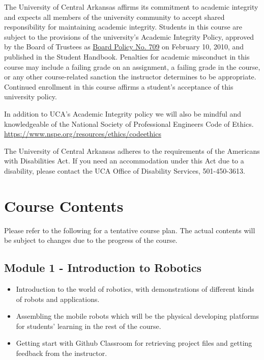 \documentclass[11pt,letterpaper]{article}
\begin{document}
The University of Central Arkansas affirms its commitment to academic integrity and expects all members of the university community to accept shared responsibility for maintaining academic integrity. Students in this course are subject to the provisions of the university's Academic Integrity Policy, approved by the Board of Trustees as \href{https://uca.edu/board/files/2010/11/709.pdf}{Board Policy No. 709} on February 10, 2010, and published in the Student Handbook. Penalties for academic misconduct in this course may include a failing grade on an assignment, a failing grade in the course, or any other course-related sanction the instructor determines to be appropriate. Continued enrollment in this course affirms a student's acceptance of this university policy.

In addition to UCA’s Academic Integrity policy we will also be mindful and knowledgeable of the National
Society of Professional Engineers Code of Ethics. \\
\href{https://www.nspe.org/resources/ethics/codeethics}{https://www.nspe.org/resources/ethics/codeethics}

The University of Central Arkansas adheres to the requirements of the Americans with Disabilities Act. If you need an accommodation under this Act due to a disability, please contact the UCA Office of Disability Services, 501-450-3613.


\section*{Course Contents}
Please refer to the following for a tentative course plan. The actual contents will be subject to changes due to the progress of the course.

\subsection*{Module 1 - Introduction to Robotics}
\begin{itemize}
    \item Introduction to the world of robotics, with demonstrations of different kinds of robots and applications.
    \item Assembling the mobile robots which will be the physical developing platforms for students' learning in the rest of the course.
    \item Getting start with Github Classroom for retrieving project files and getting feedback from the instructor.
\end{itemize}
 
\end{document}
